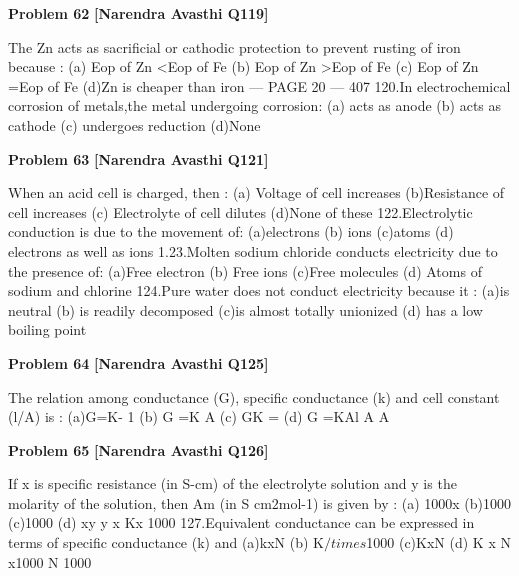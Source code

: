 \begin{problembox}
\textbf{Problem 62} \hfill \textbf{[Narendra Avasthi Q119]}
\label{q:ext-narendra_avasthi_all_questions-62}

The Zn acts as sacrificial or cathodic protection to prevent rusting of iron because :
(a) Eop of Zn <Eop of Fe
(b) Eop of Zn >Eop of Fe
(c) Eop of Zn =Eop of Fe
(d)Zn is cheaper than iron
--- PAGE 20 ---
407
120.In electrochemical corrosion of metals,the metal undergoing corrosion:
(a) acts as anode
(b) acts as cathode
(c) undergoes reduction
(d)None
\end{problembox}

\begin{problembox}
\textbf{Problem 63} \hfill \textbf{[Narendra Avasthi Q121]}
\label{q:ext-narendra_avasthi_all_questions-63}

When an acid cell is charged, then :
(a) Voltage of cell increases
(b)Resistance of cell increases
(c) Electrolyte of cell dilutes
(d)None of these
122.Electrolytic conduction is due to the movement of:
(a)electrons
(b) ions
(c)atoms
(d) electrons as well as ions
1.23.Molten sodium chloride conducts electricity due to the presence of:
(a)Free electron
(b) Free ions
(c)Free molecules
(d) Atoms of sodium and chlorine
124.Pure water does not conduct electricity because it :
(a)is neutral
(b) is readily decomposed
(c)is almost totally unionized
(d) has a low boiling point
\end{problembox}

\begin{problembox}
\textbf{Problem 64} \hfill \textbf{[Narendra Avasthi Q125]}
\label{q:ext-narendra_avasthi_all_questions-64}

The relation among conductance (G), specific conductance (k) and cell constant (l/A) is :
(a)G=K-
1
(b) G =K
A
(c) GK =
(d) G =KAl
A
A
\end{problembox}

\begin{problembox}
\textbf{Problem 65} \hfill \textbf{[Narendra Avasthi Q126]}
\label{q:ext-narendra_avasthi_all_questions-65}

If x is specific resistance (in S-cm) of the electrolyte solution and y is the molarity of the
solution, then Am (in S cm$2$mol-1) is given by :
(a)
1000x
(b)1000
(c)1000
(d)
xy
y
x
Kx
1000
127.Equivalent conductance can be expressed in terms of specific conductance (k) and
(a)kxN
(b)
K$/times$1000
(c)KxN
(d) K x N x1000
N
1000
\end{problembox}

